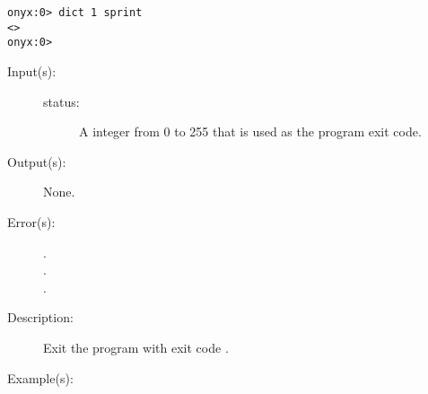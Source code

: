 \begin{description}
\begin{description}
\begin{verbatim}
onyx:0> dict 1 sprint
<>
onyx:0>
		\end{verbatim}
	\end{description}
\label{systemdict:die}
\item[{\onyxop{status}{die}{--}}: ]
	\begin{description}\item[]
	\item[Input(s): ]
		\begin{description}\item[]
		\item[status: ]
			A integer from 0 to 255 that is used as the program exit
			code.
		\end{description}
	\item[Output(s): ] None.
	\item[Error(s): ]
		\begin{description}\item[]
		\item[.]
		\item[.]
		\item[.]
		\end{description}
	\item[Description: ]
		Exit the program with exit code .
	\item[Example(s): ]\begin{verbatim}


\end{verbatim}
\end{description}
\end{description}
